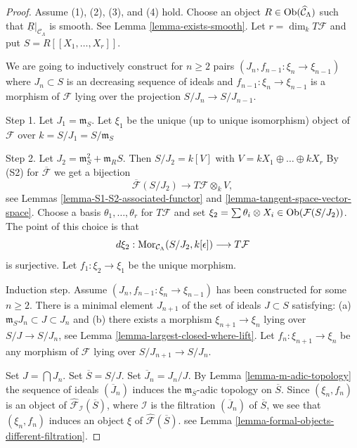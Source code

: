 \begin{proof}
Assume (1), (2), (3), and (4) hold. Choose an object
$R \in \mathop{\mathrm{Ob}}\nolimits(\widehat{\mathcal{C}}_\Lambda)$
such that $\underline{R}|_{\mathcal{C}_\Lambda}$ is smooth.
See Lemma \ref{lemma-exists-smooth}.
Let $r = \dim_k T\mathcal{F}$ and put $S = R[[X_1, \ldots, X_r]]$.

\medskip\noindent
We are going to inductively construct for $n \geq 2$ pairs
$(J_n, f_{n - 1} : \xi_n \to \xi_{n - 1})$
where $J_n \subset S$ is an decreasing sequence of ideals and
$f_{n - 1} : \xi_n \to \xi_{n - 1}$ is a morphism of
$\mathcal{F}$ lying over the projection $S/J_n \to S/J_{n - 1}$.

\medskip\noindent
Step 1. Let $J_1 = \mathfrak m_S$. Let $\xi_1$ be the unique
(up to unique isomorphism) object of $\mathcal{F}$ over
$k = S/J_1 = S/\mathfrak m_S$

\medskip\noindent
Step 2. Let
$J_2 = \mathfrak m_S^2 + \mathfrak{m}_R S$. Then
$S/J_2 = k[V]$ with $V = kX_1 \oplus \ldots \oplus kX_r$
By (S2) for $\overline{\mathcal{F}}$ we get a bijection
$$
\overline{\mathcal{F}}(S/J_2)
\longrightarrow
T\mathcal{F} \otimes_k V,
$$
see
Lemmas \ref{lemma-S1-S2-associated-functor} and
\ref{lemma-tangent-space-vector-space}.
Choose a basis $\theta_1, \ldots, \theta_r$ for $T\mathcal{F}$ and set
$\xi_2 = \sum \theta_i \otimes X_i \in \mathop{\mathrm{Ob}}\nolimits(\mathcal{F}(S/J_2))$.
The point of this choice is that
$$
d\xi_2 :
\mathop{\mathrm{Mor}}\nolimits_{\mathcal{C}_\Lambda}(S/J_2, k[\epsilon])
\longrightarrow
T\mathcal{F}
$$
is surjective. Let $f_1 : \xi_2 \to \xi_1$ be the unique morphism.

\medskip\noindent
Induction step. Assume $(J_n, f_{n - 1} : \xi_n \to \xi_{n - 1})$ has been
constructed for some $n \geq 2$. There is a minimal element $J_{n + 1}$ of
the set of ideals $J \subset S$ satisfying:
(a) $\mathfrak m_S J_n \subset J \subset J_n$ and
(b) there exists a morphism $\xi_{n + 1} \to \xi_n$ lying over
$S/J \to S/J_n$, see
Lemma \ref{lemma-largest-closed-where-lift}.
Let $f_n : \xi_{n + 1} \to \xi_n$ be any morphism of $\mathcal{F}$
lying over $S/J_{n + 1} \to S/J_n$.

\medskip\noindent
Set $J = \bigcap J_n$. Set $\overline{S} = S/J$. Set $\overline{J}_n = J_n/J$.
By
Lemma \ref{lemma-m-adic-topology}
the sequence of ideals $(\overline{J}_n)$ induces the
$\mathfrak m_{\overline{S}}$-adic topology on $\overline{S}$.
Since $(\xi_n, f_n)$ is an object of
$\widehat{\mathcal{F}}_\mathcal{I}(\overline{S})$, where $\mathcal{I}$
is the filtration $(\overline{J}_n)$ of $\overline{S}$,
we see that $(\xi_n, f_n)$
induces an object $\xi$ of $\widehat{\mathcal{F}}(\overline{S})$.
see
Lemma \ref{lemma-formal-objects-different-filtration}.


\end{proof}
